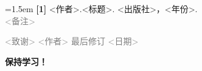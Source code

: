 \documentclass[10pt,a4paper]{article}
\begin{document}
\vspace{0.2em}
\noindent
\hangindent=1.5em
\textbf{[1]} <作者>.<标题>. <出版社>，<年份>. \\
\hspace*{1.5em}\textcolor{gray}{\small <备注>}

\vspace{0.5em}
\noindent\textcolor{gray}{\small <致谢> \quad <作者> \quad 最后修订 <日期>}

\vspace{1em}
\begin{center}
  {\Huge\bfseries\color{titlecolor} \textemdash\textemdash 保持学习！\textemdash\textemdash}
\end{center}
\end{document}
